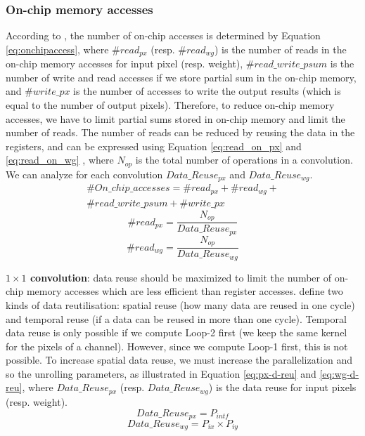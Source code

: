 \subsubsection{On-chip memory accesses}
%
According to \textcite{ma_optimizing_2018}, the number of on-chip accesses is determined by Equation \eqref{eq:onchipaccess}, where $\#read_{px}$ (resp. $\#read_{wg}$) is the number of reads in the on-chip memory accesses for input pixel (resp. weight), $\#read\_write\_psum$ is the number of write and read accesses if we store partial sum in the on-chip memory, and  $\#write\_px$ is the number of accesses to write the output results (which is equal to the number of output pixels). Therefore, to reduce on-chip memory accesses, we have to limit partial sums stored in on-chip memory and limit the number of reads.
The number of reads can be reduced by reusing the data in the registers, and can be expressed using Equation \ref{eq:read_on_px} and \ref{eq:read_on_wg} \cite{ma_optimizing_2018}, where $N_{op}$ is the total number of operations in a convolution. We can analyze for each convolution $Data\_Reuse_{px}$ and $Data\_Reuse_{wg}$.
%
\begin{multline}
    \#On\_chip\_accesses = \#read_{px} + \#read_{wg} + \\ \#read\_write\_psum + \#write\_px
    \label{eq:onchipaccess}
\end{multline}
%
\begin{equation}
    \#read_{px} = \frac{N_{op}}{Data\_Reuse_{px}}
    \label{eq:read_on_px}
\end{equation}
%
\begin{equation}
    \#read_{wg} = \frac{N_{op}}{Data\_Reuse_{wg}}
    \label{eq:read_on_wg}
\end{equation}

\textbf{$1 \times 1$ convolution}: data reuse should be maximized to limit the number of on-chip memory accesses which are less efficient than register accesses. \textcite{ma_optimizing_2018} define two kinds of data reutilisation: spatial reuse (how many data are reused in one cycle) and temporal reuse (if a data can be reused in more than one cycle). Temporal data reuse is only possible if we compute Loop-2 first (we keep the same kernel for the pixels of a channel). However, since we compute Loop-1 first, this is not possible. To increase spatial data reuse, we must increase the parallelization and so the unrolling parameters, as illustrated in Equation \eqref{eq:px-d-reu} and \eqref{eq:wg-d-reu}, where $Data\_Reuse_{px}$ (resp. $Data\_Reuse_{wg}$) is the data reuse for input pixels (resp. weight).
%
\begin{equation}
    Data\_Reuse_{px} = P_{intf}
    \label{eq:px-d-reu}
\end{equation}
\begin{equation}
    Data\_Reuse_{wg} = P_{ix} \times P_{iy}
    \label{eq:wg-d-reu}
\end{equation}

